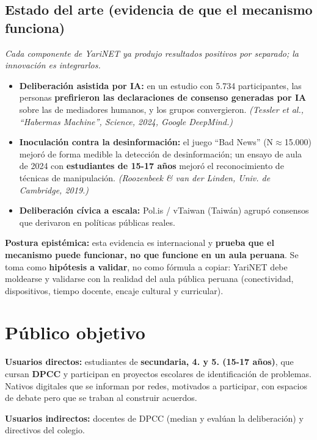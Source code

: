 \documentclass[11pt,a4paper]{article}
\begin{document}
\subsection{Estado del arte (evidencia de que el mecanismo funciona)}
\textit{Cada componente de YariNET ya produjo resultados positivos por separado; la innovaci\'on es integrarlos.}
\begin{itemize}[leftmargin=*]
  \item \textbf{Deliberaci\'on asistida por IA:} en un estudio con 5.734 participantes, las personas \textbf{prefirieron las declaraciones de consenso generadas por IA} sobre las de mediadores humanos, y los grupos convergieron. \textit{(Tessler et al., ``Habermas Machine'', Science, 2024, Google DeepMind.)}
  \item \textbf{Inoculaci\'on contra la desinformaci\'on:} el juego ``Bad News'' (N$\approx$15.000) mejor\'o de forma medible la detecci\'on de desinformaci\'on; un ensayo de aula de 2024 con \textbf{estudiantes de 15-17 a\~nos} mejor\'o el reconocimiento de t\'ecnicas de manipulaci\'on. \textit{(Roozenbeek \& van der Linden, Univ. de Cambridge, 2019.)}
  \item \textbf{Deliberaci\'on c\'ivica a escala:} Pol.is / vTaiwan (Taiw\'an) agrup\'o consensos que derivaron en pol\'iticas p\'ublicas reales.
\end{itemize}

\noindent\textbf{Postura epist\'emica:} esta evidencia es internacional y \textbf{prueba que el mecanismo puede funcionar, no que funcione en un aula peruana}. Se toma como \textbf{hip\'otesis a validar}, no como f\'ormula a copiar: YariNET debe moldearse y validarse con la realidad del aula p\'ublica peruana (conectividad, dispositivos, tiempo docente, encaje cultural y curricular).

\section{P\'ublico objetivo}

\noindent\textbf{Usuarios directos:} estudiantes de \textbf{secundaria, 4.\textordmasculine{} y 5.\textordmasculine{} (15-17 a\~nos)}, que cursan \textbf{DPCC} y participan en proyectos escolares de identificaci\'on de problemas. Nativos digitales que se informan por redes, motivados a participar, con espacios de debate pero que se traban al construir acuerdos.

\medskip
\noindent\textbf{Usuarios indirectos:} docentes de DPCC (median y eval\'uan la deliberaci\'on) y directivos del colegio.
\end{document}
